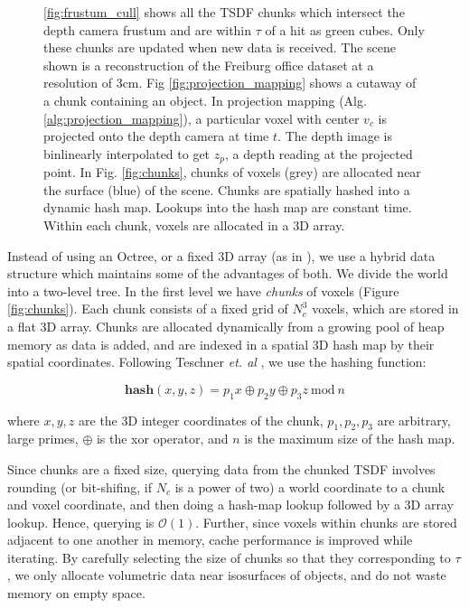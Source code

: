 \documentclass[10pt,twocolumn,letterpaper]{article}
\begin{document}
\begin{figure}
{      \ref{fig:frustum_cull} shows all the TSDF chunks which intersect the depth camera frustum  and are within $\tau$ of a hit as green cubes. Only these
      chunks are updated when new data is received. The scene shown is a
      reconstruction of the Freiburg office \cite{FREIBURG} dataset at a
      resolution of 3cm. Fig \ref{fig:projection_mapping} shows a cutaway of a
      chunk containing an object. In projection mapping (Alg. \ref{alg:projection_mapping}),  a particular voxel with
      center $v_c$ is projected onto the depth camera at time $t$. The depth image is binlinearly interpolated to get
      $z_p$, a depth reading at the projected point. In Fig. \ref{fig:chunks}, chunks of voxels (grey) are allocated near
  the surface (blue) of the scene. Chunks are spatially hashed \cite{SpatialHashing} into a
      dynamic hash map. Lookups into the hash map are constant time. Within each
      chunk, voxels are allocated in a 3D array.}
\end{figure} 

Instead of using an Octree, or a fixed 3D array (as in \cite{Newcombe,
Whelan2013}), we use a hybrid data structure which maintains some of the
advantages of both. We divide the world into a two-level tree. In the first
level we have \emph{chunks} of voxels (Figure \ref{fig:chunks}). Each chunk consists of a
fixed grid of $N_c^3$ voxels, which are stored in a flat 3D array. Chunks are
allocated dynamically from a growing pool of heap memory as data is added, and
are indexed in a spatial 3D hash map \cite{SpatialHashing} by their spatial
coordinates. Following Teschner \emph{et. al} \cite{SpatialHashing}, we use the
hashing function:

\begin{equation}
\textbf{hash}(x, y, z) = p_1 x\oplus p_2 y \oplus p_3 z
~\text{mod}~n
\end{equation}

\noindent where $x, y, z$ are the 3D integer coordinates of the chunk, $p_1,
p_2, p_3$ are arbitrary, large primes, $\oplus$ is the xor operator, and $n$ is
the maximum size of the hash map.

Since chunks are a fixed size, querying data from the chunked TSDF involves
rounding (or bit-shifing, if $N_c$ is a power of two) a world coordinate to a
chunk and voxel coordinate, and then doing a hash-map lookup followed by a 3D
array lookup. Hence, querying is $\mathcal{O}(1)$. Further, since voxels within
chunks are stored adjacent to one another in memory, cache performance is
improved while iterating. By carefully selecting the size of chunks so that they
corresponding to $\tau$, we only allocate volumetric data near isosurfaces of
objects, and do not waste memory on empty space.
\end{document}
